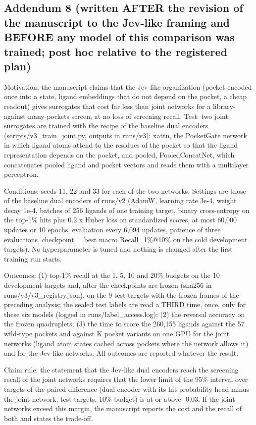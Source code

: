\subsection*{Addendum 8 (written AFTER the revision of the manuscript to the Jev-like framing and BEFORE any model of this comparison was trained; post hoc relative to the registered plan)}

Motivation: the manuscript claims that the Jev-like organization (pocket encoded once into a state, ligand embeddings that do not depend on the pocket, a cheap readout) gives surrogates that cost far less than joint networks for a library-against-many-pockets screen, at no loss of screening recall. Test: two joint surrogates are trained with the recipe of the baseline dual encoders (scripts/v3\_train\_joint.py, outputs in runs/v3): xattn, the PocketGate network in which ligand atoms attend to the residues of the pocket so that the ligand representation depends on the pocket, and pooled, PooledConcatNet, which concatenates pooled ligand and pocket vectors and reads them with a multilayer perceptron.

Conditions: seeds 11, 22 and 33 for each of the two networks. Settings are those of the baseline dual encoders of runs/v2 (AdamW, learning rate 3e-4, weight decay 1e-4, batches of 256 ligands of one training target, binary cross-entropy on the top-1\% hits plus 0.2 x Huber loss on standardized scores, at most 60,000 updates or 10 epochs, evaluation every 6,094 updates, patience of three evaluations, checkpoint = best macro Recall\_1\%@10\% on the cold development targets). No hyperparameter is tuned and nothing is changed after the first training run starts.

Outcomes: (1) top-1\% recall at the 1, 5, 10 and 20\% budgets on the 10 development targets and, after the checkpoints are frozen (sha256 in runs/v3/v3\_registry.json), on the 9 test targets with the frozen frames of the preceding analysis; the sealed test labels are read a THIRD time, once, only for these six models (logged in runs/label\_access.log); (2) the reversal accuracy on the frozen quadruplets; (3) the time to score the 260,155 ligands against the 57 wild-type pockets and against K pocket variants on one GPU for the joint networks (ligand atom states cached across pockets where the network allows it) and for the Jev-like networks. All outcomes are reported whatever the result.

Claim rule: the statement that the Jev-like dual encoders reach the screening recall of the joint networks requires that the lower limit of the 95\% interval over targets of the paired difference (dual encoder with its hit-probability head minus the joint network, test targets, 10\% budget) is at or above -0.03. If the joint networks exceed this margin, the manuscript reports the cost and the recall of both and states the trade-off.

